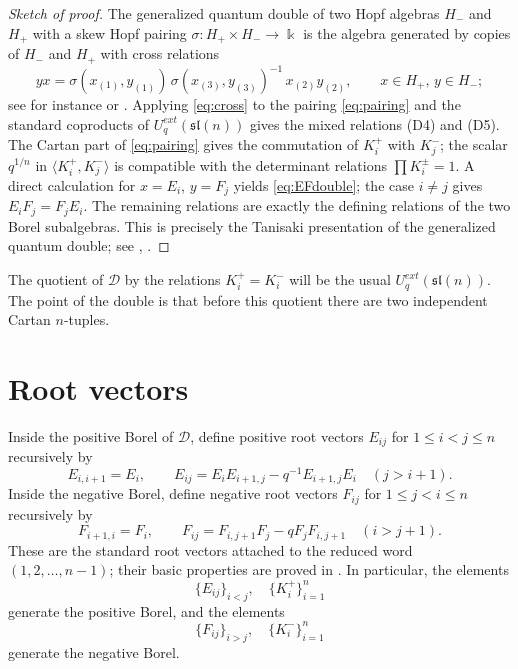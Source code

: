 \documentclass[11pt]{article}
\newcommand{\bk}{\Bbbk}
\newcommand{\slq}{\mathfrak{sl}(n)}
\newcommand{\Uq}{U_q}
\newcommand{\la}{\langle}
\newcommand{\ra}{\rangle}
\begin{document}
\begin{proof}[Sketch of proof]
The generalized quantum double of two Hopf algebras \(H_-\) and \(H_+\) with a skew Hopf pairing \(\sigma:H_+\times H_-\to\bk\) is the algebra generated by copies of \(H_-\) and \(H_+\) with cross relations
\begin{equation}\label{eq:cross}
yx=\sigma(x_{(1)},y_{(1)})\,\sigma(x_{(3)},y_{(3)})^{-1}\,x_{(2)}y_{(2)},
\qquad x\in H_+,\,y\in H_-;
\end{equation}
see for instance \cite[\S 6.3]{KS} or \cite{Majid}.  Applying \eqref{eq:cross} to the pairing \eqref{eq:pairing} and the standard coproducts of \(\Uq^{ext}(\slq)\) gives the mixed relations (D4) and (D5).  The Cartan part of \eqref{eq:pairing} gives the commutation of \(K_i^+\) with \(K_j^-\); the scalar \(q^{1/n}\) in \(\la K_i^+,K_j^-\ra\) is compatible with the determinant relations \(\prod K_i^\pm=1\).  A direct calculation for \(x=E_i\), \(y=F_j\) yields \eqref{eq:EFdouble}; the case \(i\neq j\) gives \(E_iF_j=F_jE_i\).  The remaining relations are exactly the defining relations of the two Borel subalgebras.  This is precisely the Tanisaki presentation of the generalized quantum double; see \cite{Tanisaki}, \cite[\S 9.2]{KS}.
\end{proof}

\begin{remark}
The quotient of \(\mathcal D\) by the relations \(K_i^+=K_i^-\) will be the usual \(\Uq^{ext}(\slq)\).  The point of the double is that before this quotient there are two independent Cartan \(n\)-tuples.
\end{remark}

\section{Root vectors}

Inside the positive Borel of \(\mathcal D\), define positive root vectors \(E_{ij}\) for \(1\le i<j\le n\) recursively by
\[
E_{i,i+1}=E_i,
\qquad
E_{ij}=E_iE_{i+1,j}-q^{-1}E_{i+1,j}E_i\quad(j>i+1).
\]
Inside the negative Borel, define negative root vectors \(F_{ij}\) for \(1\le j<i\le n\) recursively by
\[
F_{i+1,i}=F_i,
\qquad
F_{ij}=F_{i,j+1}F_j-qF_jF_{i,j+1}\quad(i>j+1).
\]
These are the standard root vectors attached to the reduced word
\((1,2,\dots,n-1)\); their basic properties are proved in \cite{Lu,KS}.  In particular, the elements
\[
\{E_{ij}\}_{i<j},\quad \{K_i^+\}_{i=1}^n
\]
generate the positive Borel, and the elements
\[
\{F_{ij}\}_{i>j},\quad \{K_i^-\}_{i=1}^n
\]
generate the negative Borel.
\end{document}
